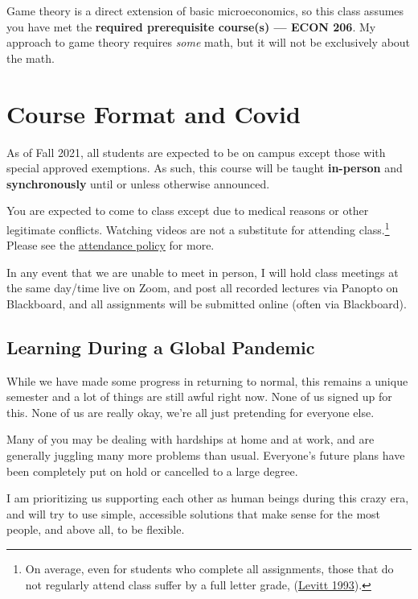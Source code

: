 \documentclass{article}
\begin{document}
Game theory is a direct extension of basic microeconomics, so this class
assumes you have met the \textbf{required prerequisite course(s) ---
ECON 206}. My approach to game theory requires \emph{some} math, but it
will not be exclusively about the math.

\hypertarget{course-format-and-covid}{%
\section{Course Format and Covid}\label{course-format-and-covid}}

As of Fall 2021, all students are expected to be on campus except those
with special approved exemptions. As such, this course will be taught
\textbf{in-person} and \textbf{synchronously} until or unless otherwise
announced.

You are expected to come to class except due to medical reasons or other
legitimate conflicts. Watching videos are not a substitute for attending
class.\footnote{On average, even for students who complete all
  assignments, those that do not regularly attend class suffer by a full
  letter grade,
  (\href{https://www.aeaweb.org/articles?id=10.1257/jep.7.3.167}{Levitt
  1993}).} Please see the \protect\hyperlink{attendance}{attendance
policy} for more.

In any event that we are unable to meet in person, I will hold class
meetings at the same day/time live on Zoom, and post all recorded
lectures via Panopto on Blackboard, and all assignments will be
submitted online (often via Blackboard).

\hypertarget{learning-during-a-global-pandemic}{%
\subsection{Learning During a Global
Pandemic}\label{learning-during-a-global-pandemic}}

While we have made some progress in returning to normal, this remains a
unique semester and a lot of things are still awful right now. None of
us signed up for this. None of us are really okay, we're all just
pretending for everyone else.

Many of you may be dealing with hardships at home and at work, and are
generally juggling many more problems than usual. Everyone's future
plans have been completely put on hold or cancelled to a large degree.

I am prioritizing us supporting each other as human beings during this
crazy era, and will try to use simple, accessible solutions that make
sense for the most people, and above all, to be flexible.
\end{document}
